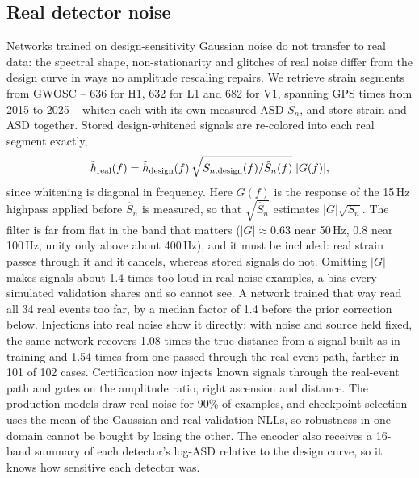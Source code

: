 \documentclass[twocolumn,linenumbers]{aastex701}
\begin{document}
\subsection{Real detector noise} \label{sec:realnoise}

Networks trained on design-sensitivity Gaussian noise do not transfer to real
data: the spectral shape, non-stationarity and glitches of real noise differ
from the design curve in ways no amplitude rescaling repairs. We retrieve
strain segments from GWOSC \citep{Vallisneri2015Gwosc, Abbott2021Gwosc,
Abbott2023GwoscO3} -- 636 for H1, 632 for L1 and 682 for V1, spanning GPS times
from 2015 to 2025 -- whiten each with its own measured ASD $\hat S_n$, and store
strain and ASD together. Stored design-whitened signals are re-colored into
each real segment exactly,
\begin{equation}
\tilde h_{\rm real}(f) = \tilde h_{\rm design}(f)\,\sqrt{S_{n,\rm design}(f)/\hat S_{n}(f)}\;|G(f)|,
\label{eq:recolor}
\end{equation}
since whitening is diagonal in frequency. Here $G(f)$ is the response of the
15\,Hz highpass applied before $\hat S_n$ is measured, so that $\sqrt{\hat S_n}$
estimates $|G|\sqrt{S_n}$. The filter is far from flat in the band that matters
($|G|\approx0.63$ near 50\,Hz, 0.8 near 100\,Hz, unity only above about
400\,Hz), and it must be included: real strain passes through it and it cancels,
whereas stored signals do not. Omitting $|G|$ makes signals about 1.4 times too
loud in real-noise examples, a bias every simulated validation shares and so
cannot see. A network trained that way read all 34 real events too far, by a
median factor of 1.4 before the prior correction below. Injections into real noise
show it directly: with noise and source held fixed, the same network recovers
1.08 times the true distance from a signal built as in training and 1.54 times
from one passed through the real-event path, farther in 101 of 102 cases.
Certification now injects known signals through the real-event path and gates on
the amplitude ratio, right ascension and distance. The production models draw real
noise for 90\% of examples, and checkpoint selection uses the mean of the
Gaussian and real validation NLLs, so robustness in one domain cannot be bought
by losing the other. The encoder also receives a 16-band summary of each
detector's log-ASD relative to the design curve, so it knows how sensitive
each detector was.
\end{document}
